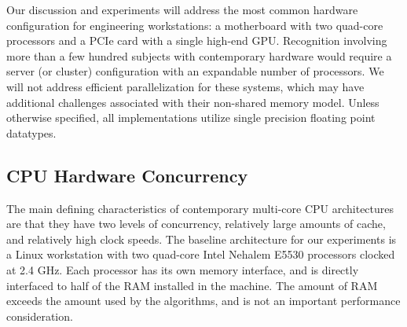 \documentclass[preprint]{sigplanconf}
\begin{document}
Our discussion and experiments will address the most common hardware
configuration for engineering workstations: a motherboard with two quad-core
processors and a PCIe card with a single high-end GPU.  
Recognition involving more than a few hundred subjects with contemporary hardware
would require a server (or cluster) configuration with an expandable 
number of processors.  We will not address efficient parallelization for 
these systems, which may have additional challenges associated with
their non-shared memory model.
Unless otherwise specified, all implementations utilize single precision
floating point datatypes.  

\subsection{CPU Hardware Concurrency}
\label{sec:CPU-concurrency}
The main defining characteristics of contemporary multi-core CPU architectures
are that they have two levels of concurrency, relatively large amounts of
cache, and relatively high clock speeds. The baseline architecture for our experiments 
is a Linux workstation with two
quad-core Intel Nehalem E5530 processors clocked at 2.4 GHz.  Each processor
has its own memory interface, and is directly interfaced to half of the RAM
installed in the machine.  The amount of RAM exceeds the amount used
by the algorithms, and is not an important performance consideration.  
\end{document}

